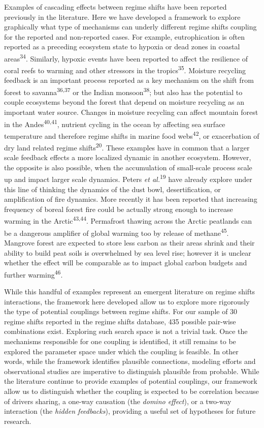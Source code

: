 \documentclass[9pt,]{article}
\begin{document}
Examples of cascading effects between regime shifts have been reported
previously in the literature. Here we have developed a framework to
explore graphically what type of mechanisms can underly different regime
shifts coupling for the reported and non-reported cases. For example,
eutrophication is often reported as a preceding ecosystem state to
hypoxia or dead zones in coastal areas\textsuperscript{34}. Similarly,
hypoxic events have been reported to affect the resilience of coral
reefs to warming and other stressors in the tropics\textsuperscript{35}.
Moisture recycling feedback is an important process reported as a key
mechanism on the shift from forest to savanna\textsuperscript{36,37} or
the Indian monsoon\textsuperscript{38}; but also has the potential to
couple ecosystems beyond the forest that depend on moisture recycling as
an important water source. Changes in moisture recycling can affect
mountain forest in the Andes\textsuperscript{40,41}, nutrient cycling in
the ocean by affecting sea surface temperature and therefore regime
shifts in marine food webs\textsuperscript{42}, or exacerbation of dry
land related regime shifts\textsuperscript{20}. These examples have in
common that a larger scale feedback effects a more localized dynamic in
another ecosystem. However, the opposite is also possible, when the
accumulation of small-scale process scale up and impact larger scale
dynamics. Peters \emph{et al.}\textsuperscript{19} have already explore
under this line of thinking the dynamics of the dust bowl,
desertification, or amplification of fire dynamics. More recently it has
been reported that increasing frequency of boreal forest fire could be
actually strong enough to increase warming in the
Arctic\textsuperscript{43,44}. Permafrost thawing across the Arctic
peatlands can be a dangerous amplifier of global warming too by release
of methane\textsuperscript{45}. Mangrove forest are expected to store
less carbon as their areas shrink and their ability to build peat soils
is overwhelmed by sea level rise; however it is unclear whether the
effect will be comparable as to impact global carbon budgets and further
warming\textsuperscript{46}.

While this handful of examples represent an emergent literature on
regime shifts interactions, the framework here developed allow us to
explore more rigorously the type of potential couplings between regime
shifts. For our sample of 30 regime shifts reported in the regime shifts
database, 435 possible pair-wise combinations exist. Exploring such
search space is not a trivial task. Once the mechanisms responsible for
one coupling is identified, it still remains to be explored the
parameter space under which the coupling is feasible. In other words,
while the framework identifies plausible connections, modeling efforts
and observational studies are imperative to distinguish plausible from
probable. While the literature continue to provide examples of potential
couplings, our framework allow us to distinguish whether the coupling is
expected to be correlation because of drivers sharing, a one-way
causation (the \emph{domino effect}), or a two-way interaction (the
\emph{hidden feedbacks}), providing a useful set of hypotheses for
future research.
\end{document}
